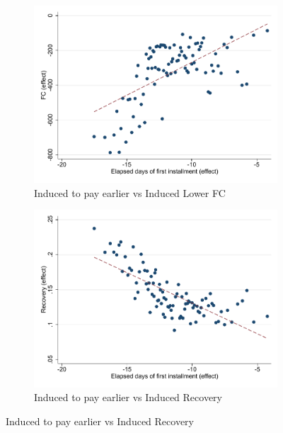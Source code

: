 \documentclass[oneside,11pt]{article}
\begin{document}
\begin{figure}[H]
    \caption{Relationship between treatment effects}
    \label{induced_to_pay_early}
    \begin{center}
    \begin{subfigure}{0.45\textwidth}
        \caption{\footnotesize{Induced to pay earlier vs Induced Lower FC}}
        \centering
        \includegraphics[width=\textwidth]{Figuras/binscatter_fc_days_pro_2.pdf}
    \end{subfigure}
        \begin{subfigure}{0.45\textwidth}
        \caption{\footnotesize{Induced to pay earlier vs Induced Recovery}}
        \centering
        \includegraphics[width=\textwidth]{Figuras/binscatter_def_days_pro_2.pdf}
    \end{subfigure}

\end{center}
\end{figure}
\end{document}
